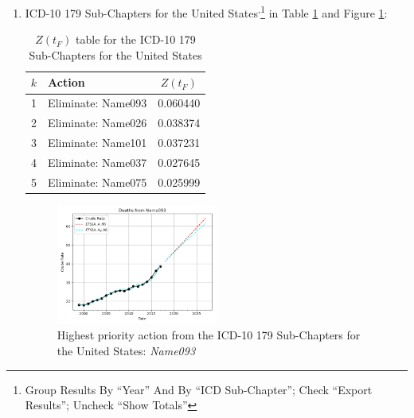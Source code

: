 \documentclass[12pt, a4paper, twocolumn]{article}
\begin{document}
\begin{enumerate}
  \vfill\eject
  \item ICD-10 179 Sub-Chapters for the United States\cite{centers2017underlying}\textsuperscript{,}\footnote{Group Results By \enquote{Year} And By \enquote{ICD Sub-Chapter}; Check \enquote{Export Results}; Uncheck \enquote{Show Totals}} in Table \ref{table:ztable6} and Figure \ref{fig:k6}:
    \begin{table}[H]
      \centering
      \begin{tabular}{clc}
        \toprule
          $k$ & Action             & $Z(t_F)$ \\
        \midrule
          1   & Eliminate: Name093 & 0.060440 \\
          2   & Eliminate: Name026 & 0.038374 \\
          3   & Eliminate: Name101 & 0.037231 \\
          4   & Eliminate: Name037 & 0.027645 \\
          5   & Eliminate: Name075 & 0.025999 \\
        \bottomrule
      \end{tabular}
      \caption{$Z(t_F)$ table for the ICD-10 179 Sub-Chapters for the United States}
      \label{table:ztable6}
    \end{table}
    \begin{figure}[H]
      \centering
      \includegraphics[width=0.5\textwidth]{results/US_ICD10_SUB_CHAPTERS/Name093_ets.png}
      \caption{Highest priority action from the ICD-10 179 Sub-Chapters for the United States: \textit{Name093}}\label{fig:k6}
    \end{figure}
    

\end{enumerate}
\end{document}
